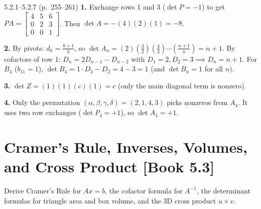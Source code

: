 \documentclass[11pt,a4paper,openany,oneside]{book}
\def\vect#1{#1}%
\def\mathbf#1{#1}%
\def\bk#1{ [Book #1]}%
\newcommand{\vect}[1]{\mathbf{#1}}
\numberwithin{equation}{chapter}
\newcommand{\bk}[1]{\texorpdfstring{\enspace{\normalfont\small\color{slate}[Book #1]}}{ [Book #1]}}
\begin{document}
\vfill
\begin{pageend_sol}{5.2.1--5.2.7 (p.\ 255--261)}
\textbf{1.} Exchange rows 1 and 3 ($\det P = -1$) to get $PA = \begin{bmatrix}4&5&6\\0&2&3\\0&0&1\end{bmatrix}$. Then $\det A = -(4)(2)(1) = -8$.

\textbf{2.} By pivots: $d_k = \frac{k+1}{k}$, so $\det A_n = (2)\left(\frac{3}{2}\right)\left(\frac{4}{3}\right)\cdots\left(\frac{n+1}{n}\right) = n + 1$. By cofactors of row 1: $D_n = 2D_{n-1} - D_{n-2}$ with $D_1=2, D_2=3 \implies D_n = n+1$. For $B_4$ ($b_{11}=1$), $\det B_4 = 1\cdot D_3 - D_2 = 4 - 3 = 1$ (and $\det B_n = 1$ for all $n$).

\textbf{3.} $\det Z = (1)(1)(c)(1) = c$ (only the main diagonal term is nonzero).

\textbf{4.} Only the permutation $(\alpha,\beta,\gamma,\delta) = (2,1,4,3)$ picks nonzeros from $A_4$. It uses two row exchanges ($\det P_4 = +1$), so $\det A_4 = +1$.
\end{pageend_sol}
\clearpage

\section{Cramer's Rule, Inverses, Volumes, and Cross Product\bk{5.3}}

\begin{goal}
Derive Cramer's Rule for $A\vect{x}=\vect{b}$, the cofactor formula for $A^{-1}$, the determinant formulas for triangle area and box volume, and the 3D cross product $\vect{u}\times\vect{v}$.
\end{goal}
\end{document}
